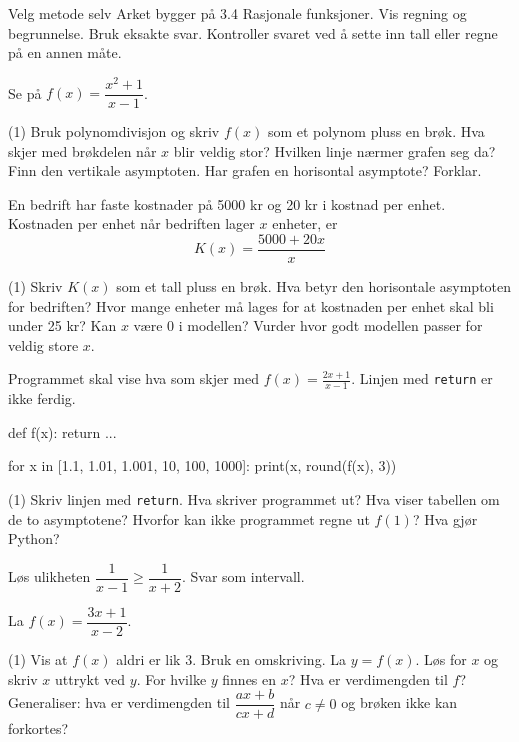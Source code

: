 
\begin{infoboks}{Velg metode selv}
Arket bygger på 3.4 Rasjonale funksjoner. Vis regning og begrunnelse. Bruk eksakte svar.
Kontroller svaret ved å sette inn tall eller regne på en annen måte.
\end{infoboks}


Se på $f(x) = \dfrac{x^2+1}{x-1}$.
\begin{tasks}(1)
  \task Bruk polynomdivisjon og skriv $f(x)$ som et polynom pluss en brøk.
  \task Hva skjer med brøkdelen når $x$ blir veldig stor? Hvilken linje nærmer grafen seg da?
  \task Finn den vertikale asymptoten. Har grafen en horisontal asymptote? Forklar.
\end{tasks}

En bedrift har faste kostnader på 5000 kr og 20 kr i kostnad per enhet. Kostnaden per enhet når bedriften lager $x$ enheter, er
\[ K(x) = \frac{5000 + 20x}{x} \]
\begin{tasks}(1)
  \task Skriv $K(x)$ som et tall pluss en brøk. Hva betyr den horisontale asymptoten for bedriften?
  \task Hvor mange enheter må lages for at kostnaden per enhet skal bli under 25 kr?
  \task Kan $x$ være 0 i modellen? Vurder hvor godt modellen passer for veldig store $x$.
\end{tasks}

Programmet skal vise hva som skjer med $f(x) = \frac{2x+1}{x-1}$. Linjen med \texttt{return} er ikke ferdig.
\begin{kode}
def f(x):
    return ...

for x in [1.1, 1.01, 1.001, 10, 100, 1000]:
    print(x, round(f(x), 3))
\end{kode}
\begin{tasks}(1)
  \task Skriv linjen med \texttt{return}. Hva skriver programmet ut?
  \task Hva viser tabellen om de to asymptotene?
  \task Hvorfor kan ikke programmet regne ut $f(1)$? Hva gjør Python?
\end{tasks}

Løs ulikheten $\dfrac{1}{x-1} \ge \dfrac{1}{x+2}$. Svar som intervall.


La $f(x) = \dfrac{3x+1}{x-2}$.
\begin{tasks}(1)
  \task Vis at $f(x)$ aldri er lik 3. Bruk en omskriving.
  \task La $y = f(x)$. Løs for $x$ og skriv $x$ uttrykt ved $y$. For hvilke $y$ finnes en $x$?
  \task Hva er verdimengden til $f$? Generaliser: hva er verdimengden til $\dfrac{ax+b}{cx+d}$ når $c \neq 0$ og brøken ikke kan forkortes?
\end{tasks}

